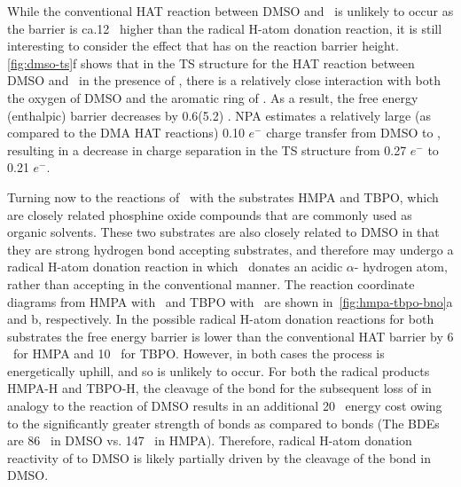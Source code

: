 \begin{doublespace}
While the conventional HAT reaction between DMSO and \bno\ is unlikely to occur
as the barrier is ca.\@ 12 \kcalmol\ higher than the radical H-atom donation
reaction, it is still interesting to consider the effect that  has on
the reaction barrier height. \ref{fig:dmso-ts}f shows that in the TS structure
for the HAT reaction between DMSO and \bno\ in the presence of , there
is a relatively close interaction with both the oxygen of DMSO and the aromatic
ring of \bno. As a result, the free energy (enthalpic) barrier decreases by
0.6(5.2) \kcalmol. NPA estimates a relatively large (as compared to the DMA HAT
reactions) 0.10 $e^-$ charge transfer from DMSO to , resulting in a
decrease in charge separation in the TS structure from 0.27 $e^-$ to 0.21 $e^-$.

Turning now to the reactions of \bno\ with the substrates HMPA and TBPO, which
are closely related phosphine oxide compounds that are commonly used as organic
solvents. These two substrates are also closely related to DMSO in that they are
strong hydrogen bond accepting substrates, and therefore may undergo a radical
H-atom donation reaction in which \bno\ donates an acidic $\alpha$-
hydrogen atom, rather than accepting in the conventional manner. The reaction
coordinate diagrams from HMPA with \bno\ and TBPO with \bno\ are shown
in~\ref{fig:hmpa-tbpo-bno}a and b, respectively. In the possible radical H-atom
donation reactions for both substrates the free energy barrier is lower than the
conventional HAT barrier by 6 \kcalmol\ for HMPA and 10 \kcalmol\ for TBPO.
However, in both cases the process is energetically uphill, and so is unlikely
to occur. For both the radical products HMPA-H and TBPO-H, the cleavage of the
 bond for the subsequent loss of  in analogy to the reaction of
DMSO results in an additional 20 \kcalmol\ energy cost owing to the
significantly greater strength of  bonds as compared to  bonds
(The BDEs are 86 \kcalmol\ in DMSO vs. 147 \kcalmol\ in
HMPA). Therefore, radical H-atom
donation reactivity of \bno to DMSO is likely partially driven by the cleavage
of the  bond in DMSO.

\begin{figure}[!htbp]
  \setcounter{subfigure}{0}
  \centering


\end{figure}
\end{doublespace}
